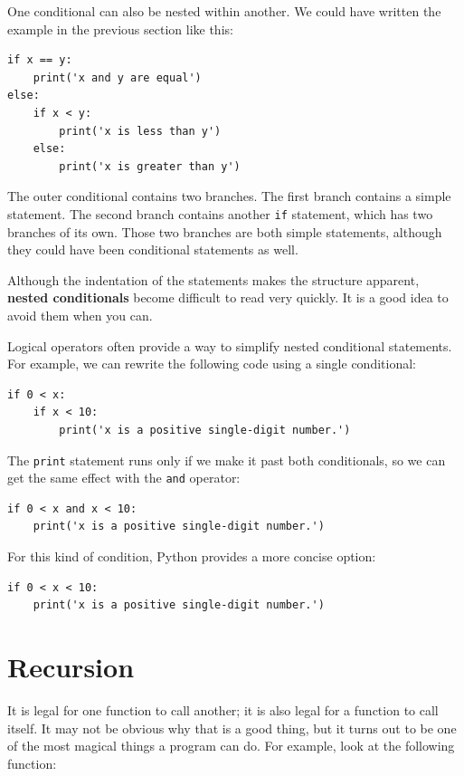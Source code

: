 \documentclass[10pt]{book}
\begin{document}
One conditional can also be nested within another.  We could have
written the example in the previous section like this:

\begin{verbatim}
if x == y:
    print('x and y are equal')
else:
    if x < y:
        print('x is less than y')
    else:
        print('x is greater than y')
\end{verbatim}
%
The outer conditional contains two branches.  The
first branch contains a simple statement.  The second branch
contains another {\tt if} statement, which has two branches of its
own.  Those two branches are both simple statements,
although they could have been conditional statements as well.

Although the indentation of the statements makes the structure
apparent, {\bf nested conditionals} become difficult to read very
quickly.  It is a good idea to avoid them when you can.

Logical operators often provide a way to simplify nested conditional
statements.  For example, we can rewrite the following code using a
single conditional:

\begin{verbatim}
if 0 < x:
    if x < 10:
        print('x is a positive single-digit number.')
\end{verbatim}
%
The {\tt print} statement runs only if we make it past both
conditionals, so we can get the same effect with the {\tt and} operator:

\begin{verbatim}
if 0 < x and x < 10:
    print('x is a positive single-digit number.')
\end{verbatim}

For this kind of condition, Python provides a more concise option:

\begin{verbatim}
if 0 < x < 10:
    print('x is a positive single-digit number.')
\end{verbatim}


\section{Recursion}
\label{recursion}

It is legal for one function to call another;
it is also legal for a function to call itself.  It may not be obvious
why that is a good thing, but it turns out to be one of the most
magical things a program can do.
For example, look at the following function:
\end{document}
